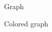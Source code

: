 \begin{description}[leftmargin=!,labelwidth=\widthof{\bfseries $G_{\chi}$}]
    \item[$G$]          Graph
    \item[$G_{\chi}$]   Colored graph
\end{description}